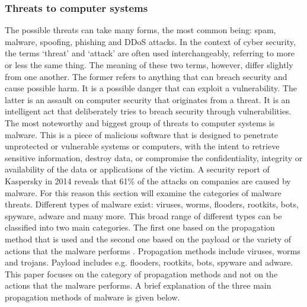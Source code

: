 \subsubsection{Threats to computer systems}


The possible threats can take many forms, the most common being: spam, malware, spoofing, phishing and  DDoS attacks.  In the context of cyber security, the terms `threat'  and `attack' are often used interchangeably, referring to more or less the same thing. The meaning of these two terms, however, differ slightly from one another. The former refers to anything that can breach security and cause possible harm. It is a possible danger that can exploit a vulnerability. The latter is an assault on computer security that originates from a threat. It is an intelligent act that deliberately tries to breach security through vulnerabilities.  \\

The most noteworthy and biggest group of threats to computer systems is malware. 
This is a piece of malicious software that is designed to penetrate unprotected or vulnerable systems or computers, with the intent to retrieve sensitive information, destroy data, or compromise the confidentiality, integrity or availability of the data or applications of the victim. A security report of Kaspersky in 2014 \cite{SurveyKaspersky} reveals that 61\% of the attacks on companies are caused by malware. For this reason this section will examine the categories of malware threats. Different types of malware exist: viruses, worms, flooders, rootkits, bots, spyware, adware and many more. This broad range of different types can be classified into two main categories. The first one based on the propagation method that is used and the second one based on the payload or the variety of actions that the malware performs \cite{stallings2007network}. Propagation methods include viruses, worms and trojans. Payload includes e.g. flooders, rootkits, bots, spyware and adware. This paper focuses on the category of propagation methods and not on the actions that the malware performs. A brief explanation of the three main propagation methods of malware is given below.  


